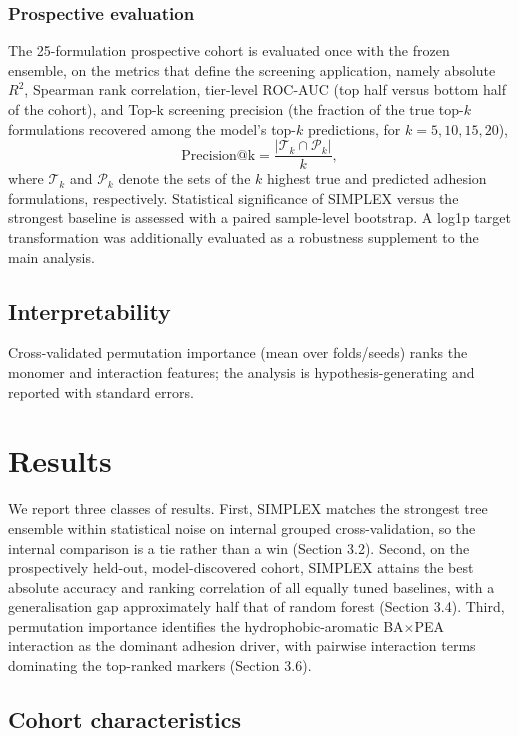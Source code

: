 \documentclass[utf8]{FrontiersinHarvard}
\begin{document}
\subsubsection{Prospective evaluation}
The 25-formulation prospective cohort is evaluated once with the frozen ensemble, on the metrics that define the screening application, namely absolute $R^2$, Spearman rank correlation, tier-level ROC-AUC (top half versus bottom half of the cohort), and Top-k screening precision (the fraction of the true top-$k$ formulations recovered among the model's top-$k$ predictions, for $k=5,10,15,20$),
\begin{equation}
\mathrm{Precision@k} = \frac{ \left| \mathcal{T}_k \cap \mathcal{P}_k \right| }{k},
\label{eq:topk}
\end{equation}
where $\mathcal{T}_k$ and $\mathcal{P}_k$ denote the sets of the $k$ highest true and predicted adhesion formulations, respectively. Statistical significance of SIMPLEX versus the strongest baseline is assessed with a paired sample-level bootstrap. A log1p target transformation was additionally evaluated as a robustness supplement to the main analysis.

\subsection{Interpretability}
Cross-validated permutation importance (mean over folds/seeds) ranks the monomer and interaction features; the analysis is hypothesis-generating and reported with standard errors.

\section{Results}

We report three classes of results. First, SIMPLEX matches the strongest tree ensemble within statistical noise on internal grouped cross-validation, so the internal comparison is a tie rather than a win (Section 3.2). Second, on the prospectively held-out, model-discovered cohort, SIMPLEX attains the best absolute accuracy and ranking correlation of all equally tuned baselines, with a generalisation gap approximately half that of random forest (Section 3.4). Third, permutation importance identifies the hydrophobic-aromatic BA$\times$PEA interaction as the dominant adhesion driver, with pairwise interaction terms dominating the top-ranked markers (Section 3.6).

\subsection{Cohort characteristics}
\end{document}
